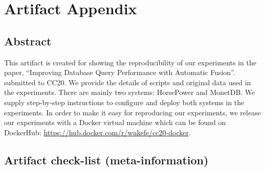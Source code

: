%
%
%
%
%
%

% 
% 
% 



\appendix
\section{Artifact Appendix}

\subsection{Abstract}

This artifact is created for showing the reproducibility of our experiments in
the paper, ``Improving Database Query Performance with Automatic Fusion''.
submitted to CC20.  We provide the details of scripts and original data used in
the experiments.  There are mainly two systems: HorsePower and MonetDB.
We supply step-by-step instructions to configure and deploy both systems in the
experiments.  In order to make it easy for reproducing our experiments, we
release our experiments with a Docker virtual machine which can be found on DockerHub:
\url{https://hub.docker.com/r/wukefe/cc20-docker}.

\subsection{Artifact check-list (meta-information)}


